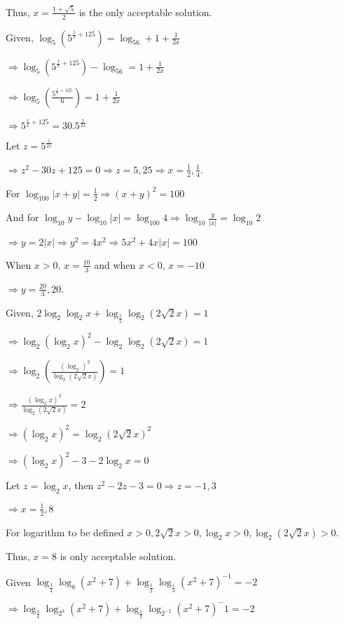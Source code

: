   Thus, $x = \frac{1+\sqrt{5}}{2}$ is the only acceptable solution.
\item Given, $\log_5\left(5^{\tfrac{1}{x} + 125}\right) = \log_56 + 1 + \frac{1}{2x}$

  $\Rightarrow \log_5\left(5^{\tfrac{1}{x} + 125}\right) - \log_56 = 1 + \frac{1}{2x}$

  $\Rightarrow \log_5\left(\tfrac{5^{\tfrac{1}{x} + 125}}{6}\right) = 1 + \frac{1}{2x}$

  $\Rightarrow 5^{\tfrac{1}{x} + 125} = 30.5^{\tfrac{1}{2x}}$

  Let $z= 5^{\tfrac{1}{2x}}$

  $\Rightarrow z^2 - 30z + 125 = 0 \Rightarrow z = 5, 25 \Rightarrow x = \frac{1}{2}, \frac{1}{4}$.
\item For $\log_{100}|x + y| = \frac{1}{2} \Rightarrow (x + y)^2 = 100$

  And for $\log_{10}y - \log_{10}|x| = \log_{100}4\Rightarrow \log_{10}\frac{y}{|x|} = \log_{10}2$

  $\Rightarrow y = 2|x| \Rightarrow y^2 = 4x^2 \Rightarrow 5x^2 + 4x|x| = 100$

  When $x > 0,\, x = \frac{10}{3}$ and when $x < 0,\,x = -10$

  $\Rightarrow y = \frac{20}{3}, 20$.
\item Given, $2\log_2\log_2x + \log_{\tfrac{1}{2}}\log_2(2\sqrt{2}x) = 1$

  $\Rightarrow \log_2(\log_2x)^2 - \log_2\log_2(2\sqrt{2}x) = 1$

  $\Rightarrow \log_2\left(\frac{(\log_2)^2}{\log_2(2\sqrt{2}x)}\right) = 1$

  $\Rightarrow \frac{(\log_2x)^2}{\log_2(2\sqrt{2}x)} = 2$

  $\Rightarrow (\log_2x)^2 = \log_2(2\sqrt{2}x)^2$

  $\Rightarrow (\log_2x)^2 - 3 - 2\log_2x = 0$

  Let $z = \log_2x$, then $z^2 - 2z - 3 = 0 \Rightarrow z = -1, 3$

  $\Rightarrow x = \frac{1}{2}, 8$

  For logarithm to be defined $x > 0, 2\sqrt{2}x > 0,\log_2x > 0, \log_2(2\sqrt{2}x) > 0$.

  Thus, $x = 8$ is only acceptable solution.
\item  Given $\log_{\tfrac{3}{4}}\log_8(x^2 + 7) + \log_{\tfrac{1}{2}}\log_{\tfrac{1}{4}}(x^2 + 7)^{-1} = -2$

  $\Rightarrow \log_{\tfrac{3}{4}}\log_{2^3}(x^2 + 7) + \log_{\tfrac{1}{2}}\log_{2^{-2}}(x^2 + 7)^-1 = -2$

